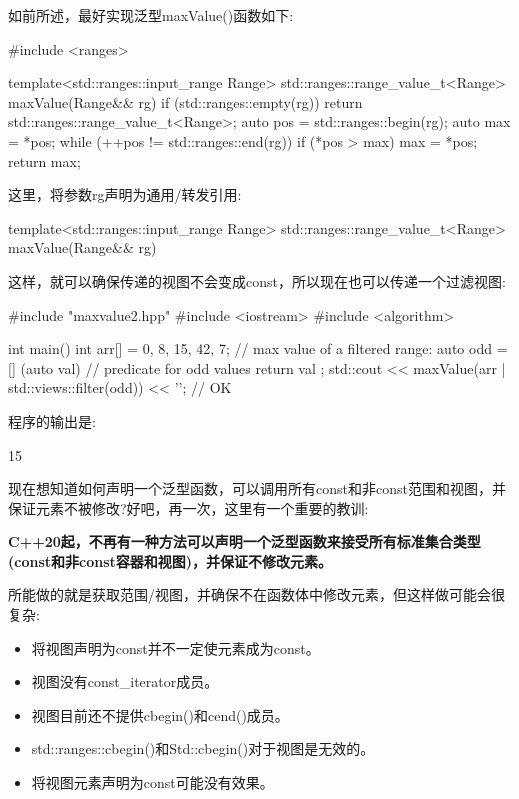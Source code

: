 如前所述，最好实现泛型maxValue()函数如下:


\begin{cpp}
#include <ranges>

template<std::ranges::input_range Range>
std::ranges::range_value_t<Range> maxValue(Range&& rg)
{
	if (std::ranges::empty(rg)) {
		return std::ranges::range_value_t<Range>{};
	}
	auto pos = std::ranges::begin(rg);
	auto max = *pos;
	while (++pos != std::ranges::end(rg)) {
		if (*pos > max) {
			max = *pos;
		}
	}
	return max;
}
\end{cpp}

这里，将参数rg声明为通用/转发引用:

\begin{cpp}
template<std::ranges::input_range Range>
std::ranges::range_value_t<Range> maxValue(Range&& rg)
\end{cpp}

这样，就可以确保传递的视图不会变成const，所以现在也可以传递一个过滤视图:


\begin{cpp}
#include "maxvalue2.hpp"
#include <iostream>
#include <algorithm>

int main()
{
	int arr[] = {0, 8, 15, 42, 7};
	// max value of a filtered range:
	auto odd = [] (auto val) { // predicate for odd values
				return val %
			};
	std::cout << maxValue(arr | std::views::filter(odd)) << '\n'; // OK
}
\end{cpp}

程序的输出是:

\begin{shell}
15
\end{shell}

现在想知道如何声明一个泛型函数，可以调用所有const和非const范围和视图，并保证元素不被修改?好吧，再一次，这里有一个重要的教训:

\textbf{C++20起，不再有一种方法可以声明一个泛型函数来接受所有标准集合类型(const和非const容器和视图)，并保证不修改元素。}

所能做的就是获取范围/视图，并确保不在函数体中修改元素，但这样做可能会很复杂:

\begin{itemize}
\item
将视图声明为const并不一定使元素成为const。

\item
视图没有const\_iterator成员。

\item
视图目前还不提供cbegin()和cend()成员。

\item
std::ranges::cbegin()和Std::cbegin()对于视图是无效的。

\item
将视图元素声明为const可能没有效果。
\end{itemize}

